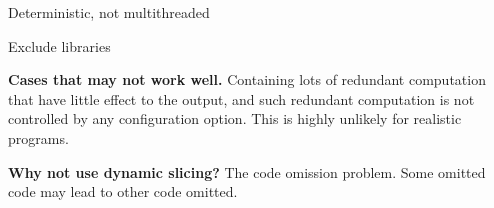 Deterministic, not multithreaded

Exclude libraries

\noindent \textbf{Cases that \ourtool may not work well.}
Containing lots of redundant computation that have
little effect to the output, and such redundant computation
is not controlled by any configuration option.
This is highly unlikely for realistic programs.

\noindent \textbf{Why not use dynamic slicing?} The code
omission problem. Some omitted code may lead to
other code omitted.


